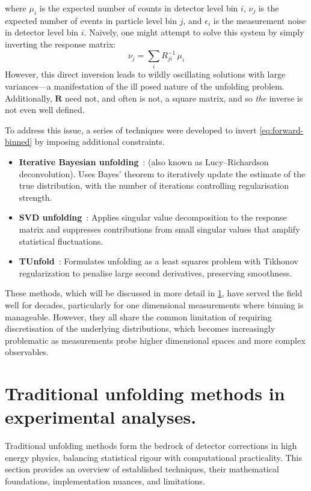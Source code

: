     where \(\mu_{i}\) is the expected number of counts in detector level bin \(i\), \(\nu_{j}\) is the expected number of events in particle level bin \(j\), and \(\epsilon_i\) is the measurement noise in detector level bin \(i\).
    Naively, one might attempt to solve this system by simply inverting the response matrix:
    \begin{equation}
        \nu_j = \sum_i R^{-1}_{ji}\,\mu_i
    \end{equation}
    However, this direct inversion leads to wildly oscillating solutions with large variances---a manifestation of the ill posed nature of the unfolding problem.
    Additionally, \(\mathbf{R}\) need not, and often is not, a square matrix, and so \emph{the} inverse is not even well defined.
    
    To address this issue, a series of techniques were developed to invert \cref{eq:forward-binned} by imposing additional constraints.
    \begin{itemize}
    \item \textbf{Iterative Bayesian unfolding}~\cite{richardson_bayesian-based_1972, lucy_iterative_1974, Schmitt2017DataPhysics}: (also known as Lucy--Richardson deconvolution). Uses Bayes' theorem to iteratively update the estimate of the true distribution, with the number of iterations controlling regularisation strength.
    \item \textbf{SVD unfolding}~\cite{hocker_svd_1996}: Applies singular value decomposition to the response matrix and suppresses contributions from small singular values that amplify statistical fluctuations.
    \item \textbf{TUnfold}~\cite{schmitt_tunfold_2012}: Formulates unfolding as a least squares problem with Tikhonov regularization to penalise large second derivatives, preserving smoothness.
    \end{itemize}

These methods, which will be discussed in more detail in \cref{sec:binned-methods}, have served the field well for decades, particularly for one dimensional measurements where binning is manageable.
%
However, they all share the common limitation of requiring discretisation of the underlying distributions, which becomes increasingly problematic as measurements probe higher dimensional spaces and more complex observables.


\section{Traditional unfolding methods in experimental analyses.}
\label{sec:binned-methods}
Traditional unfolding methods form the bedrock of detector corrections in high energy physics, balancing statistical rigour with computational practicality.
%
This section provides an overview of established techniques, their mathematical foundations, implementation nuances, and limitations.

